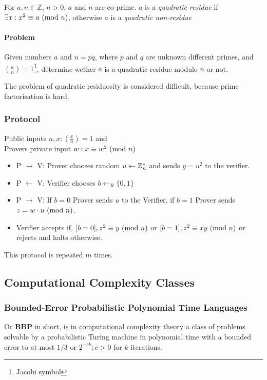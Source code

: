 For $a, n \in \mathbb{Z}$, $n > 0$, $a$ and $n$ are co-prime.
$a$ is a \textit{quadratic residue} if  $\exists x:x^2 \equiv a \ (\mathrm{mod}\ n)$, otherwise $a$ is a \textit{quadratic non-residue}

\paragraph{Problem}

Given numbers $a$ and $n = pq$, where $p$ and $q$ are unknown different primes, and $(\frac{a}{n}) = 1$\footnote{Jacobi symbol}, determine wether $a$ is a quadratic residue modulo $n$ or not.

\bigskip

The problem of quadratic residuosity is considered difficult, because prime factorisation is hard.

\subsubsection*{Protocol} %

Public inputs $n,x: (\frac{x}{n}) = 1$ and\\
Provers private input $w: x \equiv w^2 \ (\mathrm{mod}\ n)$\\

\begin{itemize}
	\item P $\rightarrow$ V: Prover chooses random  $u \leftarrow \Bbb{Z}_{n}^{*}$ and sends $y = u^2$ to the verifier.
	\item P $\leftarrow$ V: Verifier chooses $b \leftarrow_R \{0, 1\} $
	\item P $\rightarrow$ V: If $b = 0$ Prover sends $u$ to the Verifier, if $b = 1$ Prover sends $z = w \cdot u \ (\mathrm{mod}\ n)$.
	\item Verifier accepts if, $[b = 0], z^2 \equiv y \ (\mathrm{mod}\ n)$ or $[b = 1], z^2 \equiv xy \ (\mathrm{mod}\ n)$ or rejects and halts otherwise.
\end{itemize}

This protocol is repeated $m$ times.


\subsection{Computational Complexity Classes}
\subsubsection{Bounded-Error Probabilistic Polynomial Time Languages 
}
Or \textbf{BBP} in short, is in computational complexity theory a class of problems solvable by a probabilistic Turing machine in polynomial time with a bounded error to at most $1/3$ or $2^{-ck}; c>0$ for $k$ iterations.

